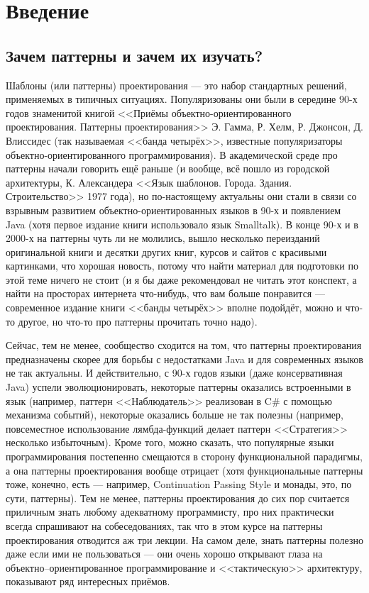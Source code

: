 \documentclass{../text-style}
\author{Юрий Литвинов\\\small{y.litvinov@spbu.ru}}
\begin{document}
\maketitle
\thispagestyle{empty}

\section{Введение}

\subsection{Зачем паттерны и зачем их изучать?}

Шаблоны (или паттерны) проектирования --- это набор стандартных решений, применяемых в типичных ситуациях. Популяризованы они были в середине 90-х годов знаменитой книгой <<Приёмы объектно-ориентированного проектирования. Паттерны проектирования>> Э. Гамма, Р. Хелм, Р. Джонсон, Д. Влиссидес (так называемая <<банда четырёх>>, известные популяризаторы объектно-ориентированного программирования). В академической среде про паттерны начали говорить ещё раньше (и вообще, всё пошло из городской архитектуры, К. Александера <<Язык шаблонов. Города. Здания. Строительство>> 1977 года), но по-настоящему актуальны они стали в связи со взрывным развитием объектно-ориентированных языков в 90-х и появлением Java (хотя первое издание книги использовало язык Smalltalk). В конце 90-х и в 2000-х на паттерны чуть ли не молились, вышло несколько переизданий оригинальной книги и десятки других книг, курсов и сайтов с красивыми картинками, что хорошая новость, потому что найти материал для подготовки по этой теме ничего не стоит (и я бы даже рекомендовал не читать этот конспект, а найти на просторах интернета что-нибудь, что вам больше понравится --- современное издание книги <<банды четырёх>> вполне подойдёт, можно и что-то другое, но что-то про паттерны прочитать точно надо). 

Сейчас, тем не менее, сообщество сходится на том, что паттерны проектирования предназначены скорее для борьбы с недостатками Java и для современных языков не так актуальны. И действительно, с 90-х годов языки (даже консервативная Java) успели эволюционировать, некоторые паттерны оказались встроенными в язык (например, паттерн <<Наблюдатель>> реализован в C\# с помощью механизма событий), некоторые оказались больше не так полезны (например, повсеместное использование лямбда-функций делает паттерн <<Стратегия>> несколько избыточным). Кроме того, можно сказать, что популярные языки программирования постепенно смещаются в сторону функциональной парадигмы, а она паттерны проектирования вообще отрицает (хотя функциональные паттерны тоже, конечно, есть --- например, Continuation Passing Style и монады, это, по сути, паттерны). Тем не менее, паттерны проектирования до сих пор считается приличным знать любому адекватному программисту, про них практически всегда спрашивают на собеседованиях, так что в этом курсе на паттерны проектирования отводится аж три лекции. На самом деле, знать паттерны полезно даже если ими не пользоваться --- они очень хорошо открывают глаза на объектно--ориентированное программирование и <<тактическую>> архитектуру, показывают ряд интересных приёмов.
\end{document}

